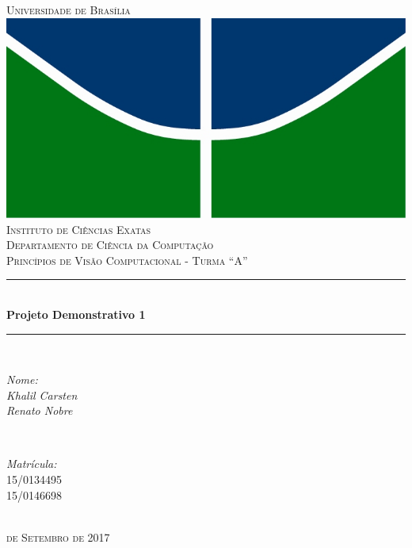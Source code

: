 \documentclass[a4paper, 12pt]{article}
\begin{document}
	\begin{titlepage}

		\newcommand{\HRule}{\rule{\linewidth}{0.5mm}}
		\centering
		\textsc{\LARGE Universidade de Brasília}\\[0.5cm]
		\includegraphics{logo.jpg}\\[0.5cm]
		\textsc{\Large Instituto de Ciências Exatas}\\[0.5cm]
		\textsc{\Large Departamento de Ciência da Computação}\\[0.5cm]
		\textsc{\Large Princípios de Visão Computacional - Turma ``A''}\\[0.5cm]
		\HRule \\[0.4cm]
		{ \huge \bfseries Projeto Demonstrativo 1}\\[0.2cm]
		\HRule \\[3.0cm]
		\begin{minipage}{0.4\textwidth}
			\begin{flushleft} \large
				\emph{Nome:}\\
				\emph{Khalil Carsten}\\
				\emph{Renato Nobre}\\
			\end{flushleft}
		\end{minipage}
		~
		\begin{minipage}{0.4\textwidth}
			\begin{flushright} \large
				\emph{Matrícula:}\\
				\textsc{15/0134495}\\
				\textsc{15/0146698}\\
			\end{flushright}
		\end{minipage}\\[6.0cm]
		\textsc{\large {} de Setembro de 2017}\\
	\end{titlepage}
\end{document}
